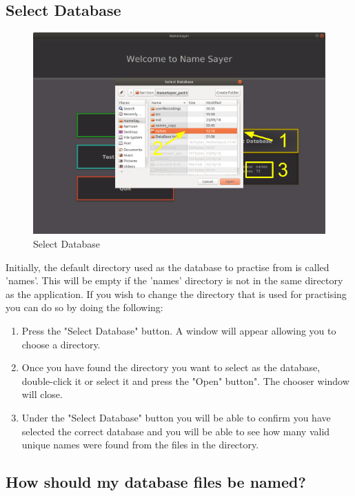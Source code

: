 \documentclass[a4paper,12pt]{article}
\begin{document}
\subsection{Select Database} 
\begin{figure}[!h]
	\includegraphics[width=\linewidth]{selectdb.png}
	\caption{Select Database}
\end{figure}
Initially, the default directory used as the database to practise from is called 'names'. This will be empty if the 'names' directory is not in the same directory as the application. If you wish to change the directory that is used for practising you can do so by doing the following:
\\
\begin{enumerate}[label=\textbf{\arabic*}]
	\item Press the "Select Database" button. A window will appear allowing you to choose a directory.
	\\
	
	\item Once you have found the directory you want to select as the database, double-click it or select it and press the "Open" button". The chooser window will close.
	\\
	
	\item Under the "Select Database" button you will be able to confirm you have selected the correct database and you will be able to see how many valid unique names were found from the files in the directory.
	\\
\end{enumerate}
\newpage
\subsection{How should my database files be named?}
 
\end{document}
